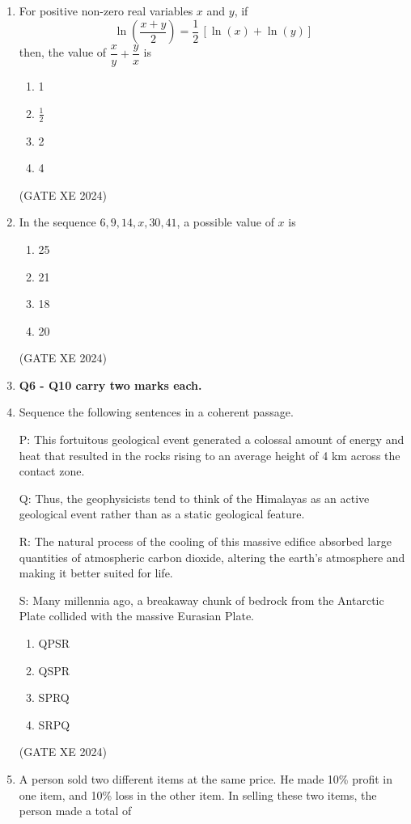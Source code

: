 \documentclass[12pt]{article}
\begin{document}
\begin{enumerate}
\item For positive non-zero real variables $x$ and $y$, if
$$
\ln\!\left(\frac{x+y}{2}\right) = \frac{1}{2}\,[\ln(x) + \ln(y)]
$$
then, the value of $\dfrac{x}{y} + \dfrac{y}{x}$ is
\begin{enumerate}
\item 1
\item $\tfrac{1}{2}$
\item 2
\item 4
\end{enumerate}
(GATE XE 2024)

\item In the sequence $6, 9, 14, x, 30, 41$, a possible value of $x$ is  
\begin{enumerate}
\item 25
\item 21
\item 18
\item 20
\end{enumerate}
(GATE XE 2024)

\item[] \textbf{Q6 - Q10 carry two marks each.}
\item Sequence the following sentences in a coherent passage.  

P: This fortuitous geological event generated a colossal amount of energy and heat that resulted in the rocks rising to an average height of 4 km across the contact zone.  

Q: Thus, the geophysicists tend to think of the Himalayas as an active geological event rather than as a static geological feature.  

R: The natural process of the cooling of this massive edifice absorbed large quantities of atmospheric carbon dioxide, altering the earth's atmosphere and making it better suited for life.  

S: Many millennia ago, a breakaway chunk of bedrock from the Antarctic Plate collided with the massive Eurasian Plate.  

\begin{enumerate}
\item QPSR  
\item QSPR  
\item SPRQ  
\item SRPQ  
\end{enumerate}
(GATE XE 2024)

\item A person sold two different items at the same price. He made 10\% profit in one item, and 10\% loss in the other item. In selling these two items, the person made a total of  


\end{enumerate}
\end{document}

